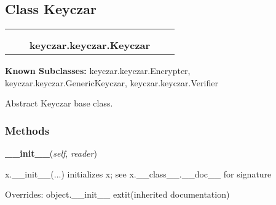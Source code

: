 
\subsection{Class Keyczar}

    \label{keyczar:keyczar:Keyczar}
\begin{tabular}{cccccc}
\multicolumn{2}{r}{\settowidth{\BCL}{object}\multirow{2}{\BCL}{object}}
&&
  \\\cline{3-3}
  &&\multicolumn{1}{c|}{}
&&
  \\
&&\multicolumn{2}{l}{\textbf{keyczar.keyczar.Keyczar}}
\end{tabular}

\textbf{Known Subclasses:}
keyczar.keyczar.Encrypter,
    keyczar.keyczar.GenericKeyczar,
    keyczar.keyczar.Verifier

Abstract Keyczar base class.



  \subsubsection{Methods}

    \vspace{0.5ex}

\hspace{.8\funcindent}\begin{boxedminipage}{\funcwidth}

    \raggedright \textbf{\_\_init\_\_}(\textit{self}, \textit{reader})

\setlength{\parskip}{2ex}
    x.\_\_init\_\_(...) initializes x; see x.\_\_class\_\_.\_\_doc\_\_ for 
    signature

\setlength{\parskip}{1ex}
      Overrides: object.\_\_init\_\_ 	extit{(inherited documentation)}

    \end{boxedminipage}

